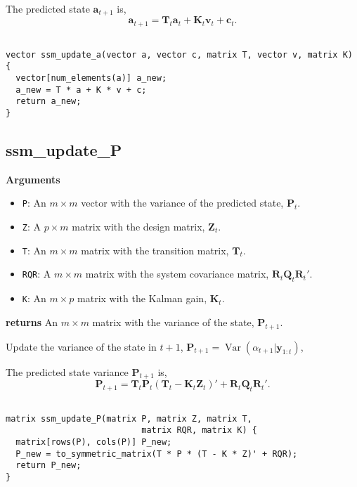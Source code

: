 \documentclass[]{book}
\providecommand{\tightlist}{%
  \setlength{\itemsep}{0pt}\setlength{\parskip}{0pt}}
\DeclareMathOperator{\Var}{Var}
\newcommand{\mat}[1]{\boldsymbol{#1}}
\renewcommand{\vec}[1]{\boldsymbol{#1}}
\begin{document}
The predicted state \(\vec{a}_{t + 1}\) is, \[
\vec{a}_{t + 1} = \mat{T}_t \vec{a}_t + \mat{K}_t \vec{v}_t + \vec{c}_t .
\]

\begin{verbatim}

vector ssm_update_a(vector a, vector c, matrix T, vector v, matrix K) {
  vector[num_elements(a)] a_new;
  a_new = T * a + K * v + c;
  return a_new;
}

\end{verbatim}

\subsection{ssm\_update\_P}\label{ssm_update_p}

\textbf{Arguments}

\begin{itemize}
\tightlist
\item
  \texttt{P}: An \(m \times m\) vector with the variance of the
  predicted state, \(\mat{P}_t\).
\item
  \texttt{Z}: A \(p \times m\) matrix with the design matrix,
  \(\mat{Z}_t\).
\item
  \texttt{T}: An \(m \times m\) matrix with the transition matrix,
  \(\mat{T}_t\).
\item
  \texttt{RQR}: A \(m \times m\) matrix with the system covariance
  matrix, \(\mat{R}_t \mat{Q}_t \mat{R}_t'\).
\item
  \texttt{K}: An \(m \times p\) matrix with the Kalman gain,
  \(\mat{K}_t\).
\end{itemize}

\textbf{returns} An \(m \times m\) matrix with the variance of the
state, \(\vec{P}_{t + 1}\).

Update the variance of the state in \(t + 1\),
\(\mat{P}_{t + 1} = \Var(\alpha_{t + 1} | \vec{y}_{1:t})\),

The predicted state variance \(\mat{P}_{t + 1}\) is, \[
\mat{P}_{t + 1} = \mat{T}_t \mat{P}_t (\mat{T}_t - \mat{K}_t \mat{Z}_t)' + \mat{R}_t \mat{Q}_t \mat{R}_t' .
\]

\begin{verbatim}

matrix ssm_update_P(matrix P, matrix Z, matrix T,
                           matrix RQR, matrix K) {
  matrix[rows(P), cols(P)] P_new;
  P_new = to_symmetric_matrix(T * P * (T - K * Z)' + RQR);
  return P_new;
}

\end{verbatim}
\end{document}
